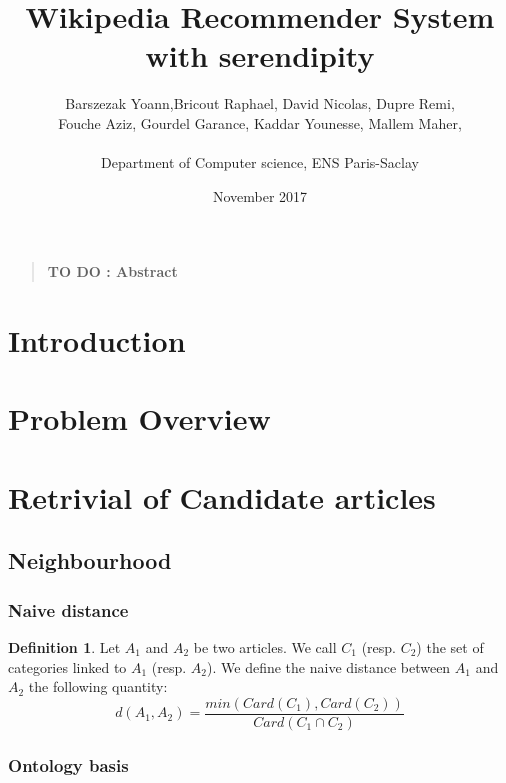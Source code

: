 \documentclass[12pt]{article}
\title{Wikipedia Recommender System with serendipity}
\author
    {
      Barszezak Yoann,Bricout Raphael, David Nicolas, Dupre Remi,\\
      Fouche Aziz, Gourdel Garance, Kaddar Younesse, Mallem Maher,\\
      \\
      \normalsize{Department of Computer science, ENS Paris-Saclay}\\
    }
\date{November 2017}
\theoremstyle{plain}
\theoremstyle{definition}
\newtheorem{defn}{Definition}[section]
\theoremstyle{remark}
\newenvironment{sciabstract}{%
\begin{quote} \bf}
{\end{quote}}
\begin{document}
 


\baselineskip24pt


\maketitle 




\begin{sciabstract}
  TO DO : Abstract
\end{sciabstract}





\section{Introduction}


\section{Problem Overview}




\section{Retrivial of Candidate articles}

\subsection{Neighbourhood}
\subsubsection{Naive distance}

\begin{defn}
  Let $A_1$ and $A_2$ be two articles. We call $C_1$ (resp. $C_2$) the set of categories linked to $A_1$ (resp. $A_2$).
  We define the naive distance between $A_1$ and $A_2$ the following quantity:\\
  \begin{equation*}
    d(A_1,A_2) = \frac{min(Card(C_1),Card(C_2))}{Card(C_1 \cap C_2)}
  \end{equation*}
\end{defn}


\subsubsection{Ontology basis}
\end{document}
